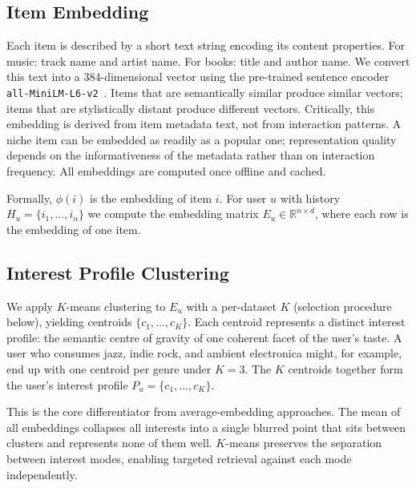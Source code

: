 \documentclass[11pt,a4paper]{article}
\begin{document}
\subsection{Item Embedding}
Each item is described by a short text string encoding its content properties.
For music: track name and artist name. For books: title and author name. We
convert this text into a 384-dimensional vector using the pre-trained sentence
encoder \texttt{all-MiniLM-L6-v2}~\cite{reimers2019,wang2020}. Items that are
semantically similar produce similar vectors; items that are stylistically
distant produce different vectors. Critically, this embedding is derived from item metadata text, not from
interaction patterns. A niche item can be embedded as readily as a popular
one; representation quality depends on the informativeness of the metadata
rather than on interaction frequency. All embeddings are computed once offline
and cached.

Formally, $\phi(i)$ is the embedding of item $i$. For user $u$ with history
$H_u = \{i_1, \ldots, i_n\}$ we compute the embedding matrix
$E_u \in \mathbb{R}^{n \times d}$, where each row is the embedding of one
item.

\subsection{Interest Profile Clustering}
We apply $K$-means clustering to $E_u$ with a per-dataset $K$ (selection
procedure below), yielding centroids $\{c_1, \ldots, c_K\}$. Each centroid
represents a distinct interest profile: the semantic centre of gravity of
one coherent facet of the user's taste. A user who consumes jazz, indie
rock, and ambient electronica might, for example, end up with one centroid
per genre under $K=3$. The $K$ centroids together form the user's interest
profile $P_u = \{c_1, \ldots, c_K\}$.

This is the core differentiator from average-embedding approaches. The mean
of all embeddings collapses all interests into a single blurred point that
sits between clusters and represents none of them well. $K$-means preserves
the separation between interest modes, enabling targeted retrieval against
each mode independently.
\end{document}
